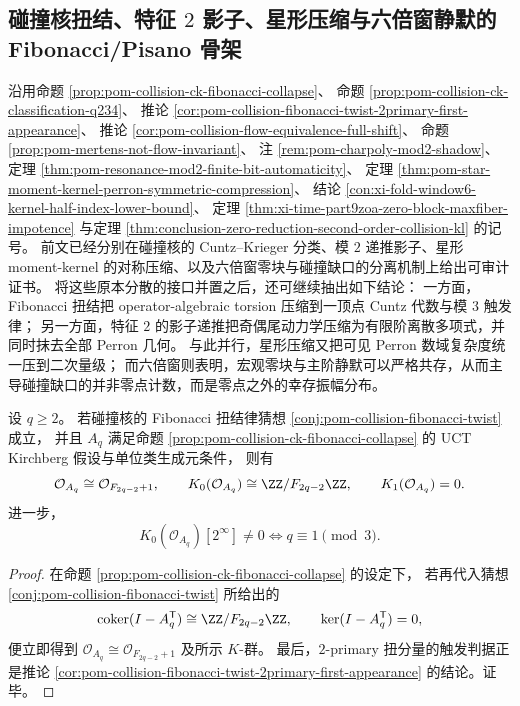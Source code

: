\subsection{碰撞核扭结、特征 \texorpdfstring{$2$}{2} 影子、星形压缩与六倍窗静默的 Fibonacci/Pisano 骨架}\label{subsec:conclusion-qcollision-fibonacci-pisano-shadow-zeroblock}

沿用命题 \ref{prop:pom-collision-ck-fibonacci-collapse}、
命题 \ref{prop:pom-collision-ck-classification-q234}、
推论 \ref{cor:pom-collision-fibonacci-twist-2primary-first-appearance}、
推论 \ref{cor:pom-collision-flow-equivalence-full-shift}、
命题 \ref{prop:pom-mertens-not-flow-invariant}、
注 \ref{rem:pom-charpoly-mod2-shadow}、
定理 \ref{thm:pom-resonance-mod2-finite-bit-automaticity}、
定理 \ref{thm:pom-star-moment-kernel-perron-symmetric-compression}、
结论 \ref{con:xi-fold-window6-kernel-half-index-lower-bound}、
定理 \ref{thm:xi-time-part9zoa-zero-block-maxfiber-impotence}
与定理 \ref{thm:conclusion-zero-reduction-second-order-collision-kl} 的记号。
前文已经分别在碰撞核的 Cuntz--Krieger 分类、模 \(2\) 递推影子、星形 moment-kernel 的对称压缩、以及六倍窗零块与碰撞缺口的分离机制上给出可审计证书。
将这些原本分散的接口并置之后，还可继续抽出如下结论：
一方面，Fibonacci 扭结把 operator-algebraic torsion 压缩到一顶点 Cuntz 代数与模 \(3\) 触发律；
另一方面，特征 \(2\) 的影子递推把奇偶尾动力学压缩为有限阶离散多项式，并同时抹去全部 Perron 几何。
与此并行，星形压缩又把可见 Perron 数域复杂度统一压到二次量级；
而六倍窗则表明，宏观零块与主阶静默可以严格共存，从而主导碰撞缺口的并非零点计数，而是零点之外的幸存振幅分布。

\begin{theorem}\label{thm:conclusion-collision-ck-fibonacci-collapse-triresidue}
设 \(q\ge 2\)。
若碰撞核的 Fibonacci 扭结律猜想
\ref{conj:pom-collision-fibonacci-twist} 成立，
并且 \(A_q\) 满足命题 \ref{prop:pom-collision-ck-fibonacci-collapse} 的
UCT Kirchberg 假设与单位类生成元条件，
则有
\[
\mathcal O_{A_q}\cong \mathcal O_{F_{2q-2}+1},
\qquad
K_0(\mathcal O_{A_q})\cong \ZZ/F_{2q-2}\ZZ,
\qquad
K_1(\mathcal O_{A_q})=0.
\]
进一步，
\[
K_0(\mathcal O_{A_q})[2^\infty]\neq 0
\iff q\equiv 1\pmod 3.
\]
\end{theorem}
\begin{proof}
在命题 \ref{prop:pom-collision-ck-fibonacci-collapse} 的设定下，
若再代入猜想 \ref{conj:pom-collision-fibonacci-twist} 所给出的
\[
\mathrm{coker}(I-A_q^{\mathsf T})\cong \ZZ/F_{2q-2}\ZZ,
\qquad
\ker(I-A_q^{\mathsf T})=0,
\]
便立即得到
\(
\mathcal O_{A_q}\cong \mathcal O_{F_{2q-2}+1}
\)
及所示 \(K\)-群。
最后，\(2\)-primary 扭分量的触发判据正是推论
\ref{cor:pom-collision-fibonacci-twist-2primary-first-appearance} 的结论。证毕。
\end{proof}

